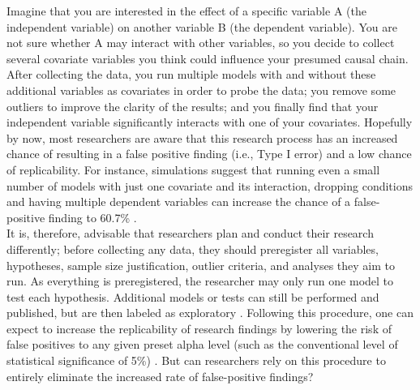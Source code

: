 Imagine that you are interested in the effect of a specific variable A (the independent variable) on another variable B (the dependent variable). You are not sure whether A may interact with other variables, so you decide to collect several covariate variables you think could influence your presumed causal chain. After collecting the data, you run multiple models with and without these additional variables as covariates in order to probe the data; you remove some outliers to improve the clarity of the results; and you finally find that your independent variable significantly interacts with one of your covariates. Hopefully by now, most researchers are aware that this research process has an increased chance of resulting in a false positive finding (i.e., Type I error) and a low chance of replicability. For instance, simulations suggest that running even a small number of models with just one covariate and its interaction, dropping conditions and having multiple dependent variables can increase the chance of a false-positive finding to 60.7\% \citep{Simmons2011}.\\

It is, therefore, advisable that researchers plan and conduct their research differently; before collecting any data, they should preregister all variables, hypotheses, sample size justification, outlier criteria, and analyses they aim to run. As everything is preregistered, the researcher may only run one model to test each hypothesis. Additional models or tests can still be performed and published, but are then labeled as exploratory \citep{Nosek2018}. Following this procedure, one can expect to increase the replicability of research findings by lowering the risk of false positives to any given preset alpha level (such as the conventional level of statistical significance of 5\%) \citep{Moore2016}. But can researchers rely on this procedure to entirely eliminate the increased rate of false-positive findings? \\

